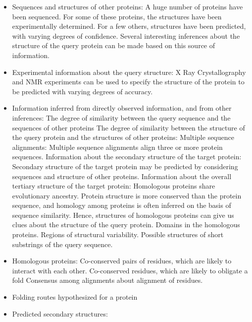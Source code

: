 \documentclass[10pt]{report}
\begin{document}
\begin{itemize}

 \item Sequences and structures of other proteins: A huge number of proteins have been sequenced. For some of these proteins, the structures have been experimentally determined. For a few others, structures have been predicted, with varying degrees of confidence. Several interesting inferences about the structure of the query protein can be made based on this source of information.
 \item Experimental information about the query structure: X Ray Crystallography and NMR experiments can be used to specify the structure of the protein to be predicted with varying degrees of accuracy.
 \item Information inferred from directly observed information, and from other inferences:
 \subitem The degree of similarity between the query sequence and the sequences of other proteins
 \subitem The degree of similarity between the structure of the query protein and the structures of other proteins:
 \subitem Multiple sequence alignments: Multiple sequence alignments align three or more protein sequences.
 \subitem Information about the secondary structure of the target protein: Secondary structure of the target protein may be predicted by considering sequences and structure of other proteins.
 \subitem Information about the overall tertiary structure of the target protein: Homologous proteins share evolutionary ancestry. Protein structure is more conserved than the protein sequence, and homology among proteins is often inferred on the basis of sequence similarity. Hence, structures of homologous proteins can give us clues about the structure of the query protein.
 \subitem Domains in the homologous proteins.
 \subitem Regions of structural variability.
 \subitem Possible structures of short substrings of the query sequence.

 \item Homologous proteins: 
 \subitem Co-conserved pairs of residues, which are likely to interact with each other.
 \subitem Co-conserved residues, which are likely to obligate a fold
 \subitem Consensus among alignments about alignment of residues.

 \item Folding routes hypothesized for a protein
 \item Predicted secondary structures:

\end{itemize}
\end{document}
